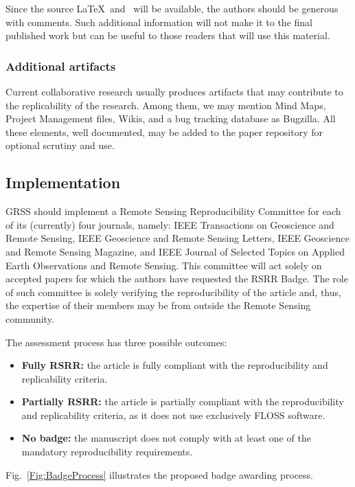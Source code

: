 \documentclass[journal,twoside]{IEEEtran}
\begin{document}
Since the source \LaTeX\ and \BibTeX\ will be available, the authors should be generous with comments.
Such additional information will not make it to the final published work but can be useful to those readers that will use this material.

\subsubsection{Additional artifacts}
Current collaborative research usually produces artifacts that may contribute to the replicability of the research.
Among them, we may mention 
Mind Maps, 
Project Management files, 
Wikis, 
and a bug tracking database as Bugzilla.
All these elements, well documented, may be added to the paper repository for optional scrutiny and use.


\subsection{Implementation}\label{Sec:Implementation}

GRSS should implement a Remote Sensing Reproducibility Committee for each of its (currently) four journals, namely:
IEEE Transactions on Geoscience and Remote Sensing,
IEEE Geoscience and Remote Sensing Letters,
IEEE Geoscience and Remote Sensing Magazine, and
IEEE Journal of Selected Topics on Applied Earth Observations and Remote Sensing.
This committee will act solely on accepted papers for which the authors have requested the RSRR Badge.
The role of such committee is solely verifying the reproducibility of the article and, thus, the expertise of their members may be from outside the Remote Sensing community.

The assessment process has three possible outcomes:
\begin{itemize}
	\item \textbf{Fully RSRR:} the article is fully compliant with the reproducibility and replicability criteria.
	\item \textbf{Partially RSRR:} the article is partially compliant with the reproducibility and replicability criteria, as it does not use exclusively FLOSS software.
	\item \textbf{No badge:} the manuscript does not comply with at least one of the mandatory reproducibility requirements.
\end{itemize}

Fig.~\ref{Fig:BadgeProcess} illustrates the proposed badge awarding process.
\end{document}
